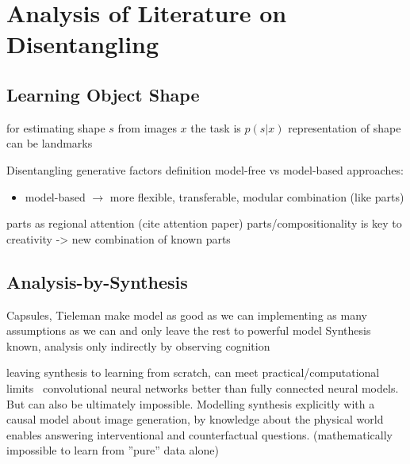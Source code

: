 \chapter{Analysis of Literature on Disentangling}


\section{Learning Object Shape}
for estimating shape $s$ from images $x$ the task is
$p(s|x)$
representation of shape can be landmarks


Disentangling generative factors definition
model-free vs model-based approaches:
\begin{itemize}
	\item model-based $\rightarrow$ more flexible, transferable, modular combination (like parts)
\end{itemize}
parts as regional attention (cite attention paper)
parts/compositionality is key to creativity -> new combination of known parts


\section{Analysis-by-Synthesis}
	Capsules, Tieleman \cite{tieleman14thesis}
	make model as good as we can implementing as many assumptions as we can and only leave the rest to powerful model
	Synthesis known, analysis only indirectly by observing cognition

	leaving synthesis to learning from scratch, can meet practical/computational limits \eg\ convolutional neural networks better than fully connected neural models.
	But can also be ultimately impossible. Modelling synthesis explicitly with a causal model about image generation, by knowledge about the physical world enables answering interventional and counterfactual questions. (mathematically impossible to learn from ''pure'' data alone)


